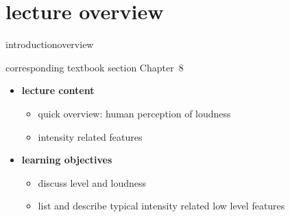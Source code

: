 


\subtitle{Module 8.0: Intensity}


	

    \section[overview]{lecture overview}
        \begin{frame}{introduction}{overview}
            \begin{block}{corresponding textbook section}
                    Chapter~8
            \end{block}

            \begin{itemize}
                \item   \textbf{lecture content}
                    \begin{itemize}
                        \item   quick overview: human perception of loudness 
                        \item   intensity related features
                    \end{itemize}
                \bigskip
                \item<2->   \textbf{learning objectives}
                    \begin{itemize}
                        \item   discuss level and loudness
                        \item   list and describe typical intensity related low level features
                    \end{itemize}
            \end{itemize}
        \end{frame}

